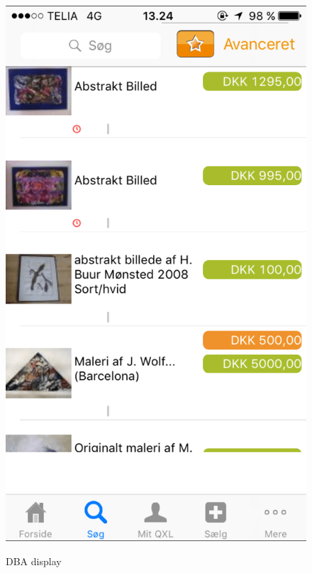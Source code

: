 \begin{figure}[H]
\begin{minipage}[b]{0.285\linewidth}
    \includegraphics[width=\linewidth]{Appendix/ScreenshotsCompetitorsPlatforms/QXL-min.png}
    \label{QXLDisplay}
  \end{minipage}
 \hspace{0.6cm}
  \begin{minipage}[b]{0.285\linewidth}
    \caption{DBA display}

\end{minipage}
\end{figure}
